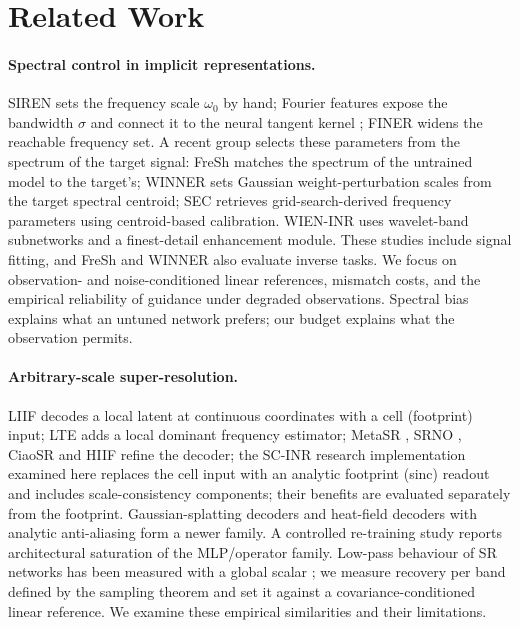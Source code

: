 \section{Related Work}\label{sec:related}

\paragraph{Spectral control in implicit representations.}
SIREN \citep{sitzmann2020siren} sets the frequency scale $\omega_0$ by hand;
Fourier features \citep{tancik2020fourier} expose the bandwidth $\sigma$ and
connect it to the neural tangent kernel \citep{jacot2018ntk}; FINER
\citep{liu2024finer} widens the reachable frequency set. A recent group
selects these parameters from the spectrum of the target signal: FreSh
\citep{kania2025fresh} matches the spectrum of the untrained model to the
target's; WINNER \citep{winner2025} sets Gaussian weight-perturbation scales
from the target spectral centroid; SEC \citep{sec2026} retrieves
grid-search-derived frequency parameters using centroid-based calibration.
WIEN-INR \citep{wieninr} uses wavelet-band subnetworks and a finest-detail
enhancement module. These studies include signal fitting, and FreSh and
WINNER also evaluate inverse tasks. We focus on observation- and
noise-conditioned linear references, mismatch costs, and the empirical
reliability of guidance under degraded observations. Spectral bias
\citep{rahaman2019spectral} explains what an untuned network prefers; our
budget explains what the observation permits.

\paragraph{Arbitrary-scale super-resolution.}
LIIF \citep{chen2021liif} decodes a local latent at continuous coordinates
with a cell (footprint) input; LTE \citep{lee2022lte} adds a local dominant
frequency estimator; MetaSR \citep{hu2019metasr}, SRNO \citep{wei2023srno},
CiaoSR \citep{cao2023ciaosr} and HIIF \citep{jiang2025hiif} refine the
decoder; the SC-INR research implementation examined here replaces the cell input with an
analytic footprint (sinc) readout and includes scale-consistency components; their benefits are evaluated separately from the footprint. Gaussian-splatting decoders
\citep{chen2025gsasr} and heat-field decoders with analytic anti-aliasing
\citep{becker2025thera} form a newer family. A controlled re-training study
\citep{nasir2026empirical} reports architectural saturation of the MLP/operator
family. Low-pass behaviour of SR networks has been measured with a global
scalar \citep{fsds2024}; we measure recovery per band defined by the sampling
theorem and set it against a covariance-conditioned linear reference. We examine these empirical similarities and their limitations.

